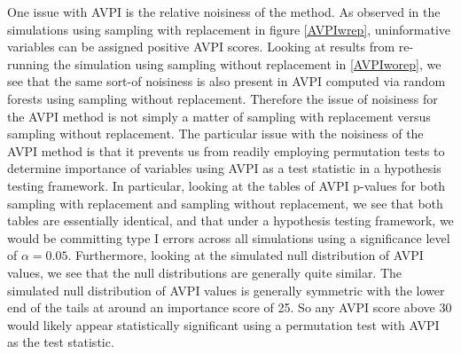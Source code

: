 \documentclass[12pt,twoside]{reedthesis}
\theoremstyle{definition}
\theoremstyle{definition}
\theoremstyle{definition}
\theoremstyle{remark}
\begin{document}
One issue with AVPI is the relative noisiness of the method. As observed
in the simulations using sampling with replacement in figure
\ref{AVPIwrep}, uninformative variables can be assigned positive AVPI
scores. Looking at results from re-running the simulation using sampling
without replacement in \ref{AVPIworep}, we see that the same sort-of
noisiness is also present in AVPI computed via random forests using
sampling without replacement. Therefore the issue of noisiness for the
AVPI method is not simply a matter of sampling with replacement versus
sampling without replacement. The particular issue with the noisiness of
the AVPI method is that it prevents us from readily employing
permutation tests to determine importance of variables using AVPI as a
test statistic in a hypothesis testing framework. In particular, looking
at the tables of AVPI p-values for both sampling with replacement and
sampling without replacement, we see that both tables are essentially
identical, and that under a hypothesis testing framework, we would be
committing type I errors across all simulations using a significance
level of \(\alpha = 0.05\). Furthermore, looking at the simulated null
distribution of AVPI values, we see that the null distributions are
generally quite similar. The simulated null distribution of AVPI values
is generally symmetric with the lower end of the tails at around an
importance score of 25. So any AVPI score above 30 would likely appear
statistically significant using a permutation test with AVPI as the test
statistic. \par
\end{document}
